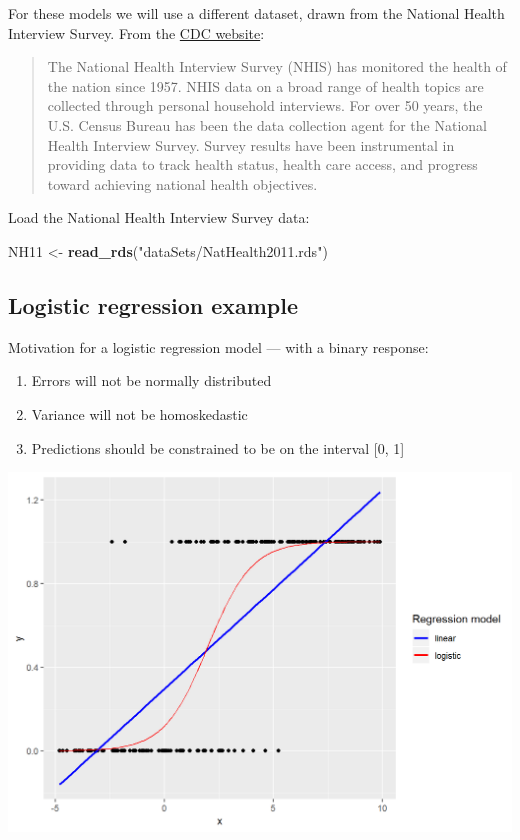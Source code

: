 \documentclass[]{book}
\newenvironment{Shaded}{\begin{snugshade}}{\end{snugshade}}
\newcommand{\KeywordTok}[1]{\textcolor[rgb]{0.13,0.29,0.53}{\textbf{#1}}}
\newcommand{\NormalTok}[1]{#1}
\newcommand{\StringTok}[1]{\textcolor[rgb]{0.31,0.60,0.02}{#1}}
\providecommand{\tightlist}{%
  \setlength{\itemsep}{0pt}\setlength{\parskip}{0pt}}
\begin{document}
For these models we will use a different dataset, drawn from the National Health Interview Survey. From the \href{http://www.cdc.gov/nchs/nhis.htm}{CDC website}:

\begin{quote}
The National Health Interview Survey (NHIS) has monitored the health of the nation since 1957. NHIS data on a broad range of health topics are collected through personal household interviews. For over 50 years, the U.S. Census Bureau has been the data collection agent for the National Health Interview Survey. Survey results have been instrumental in providing data to track health status, health care access, and progress toward achieving national health objectives.
\end{quote}

Load the National Health Interview Survey data:

\begin{Shaded}
\begin{Highlighting}[]
\NormalTok{  NH11 <-}\StringTok{ }\KeywordTok{read_rds}\NormalTok{(}\StringTok{"dataSets/NatHealth2011.rds"}\NormalTok{)}
\end{Highlighting}
\end{Shaded}

\hypertarget{logistic-regression-example}{%
\subsection{Logistic regression example}\label{logistic-regression-example}}

Motivation for a logistic regression model --- with a binary response:

\begin{enumerate}
\def\labelenumi{\arabic{enumi}.}
\tightlist
\item
  Errors will not be normally distributed
\item
  Variance will not be homoskedastic
\item
  Predictions should be constrained to be on the interval {[}0, 1{]}
\end{enumerate}

\includegraphics{R/Rmodels/images/logistic.png}
\end{document}
